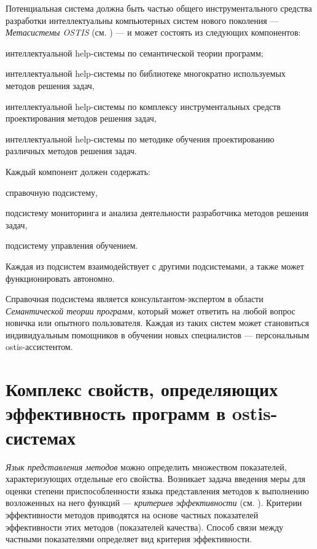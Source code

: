 Потенциальная система должна быть частью общего инструментального средства разработки интеллектуальны компьютерных систем нового поколения --- \textit{Метасистемы OSTIS} (см. ) --- и может состоять из следующих компонентов:
\begin{textitemize}
	\item интеллектуальной help-системы по семантической теории программ;
	\item интеллектуальной help-системы по библиотеке многократно используемых методов решения задач,
	\item интеллектуальной help-системы по комплексу инструментальных средств проектирования  методов решения задач,
	\item интеллектуальной help-системы по методике обучения проектированию различных методов решения задач.
\end{textitemize}

Каждый компонент должен содержать:
\begin{textitemize}
	\item справочную подсистему,
	\item подсистему мониторинга и анализа деятельности разработчика методов решения задач,
	\item подсистему управления обучением.
\end{textitemize}

Каждая из подсистем взаимодействует с другими подсистемами, а также может функционировать автономно.

Справочная подсистема является консультантом-экспертом в области \textit{Семантической теории программ}, который может ответить на любой вопрос новичка или опытного пользователя. Каждая из таких систем может становиться индивидуальным помощников в обучении новых специалистов --- персональным ostis-ассистентом.

\section{Комплекс свойств, определяющих эффективность программ в ostis-системах}
\label{sec_programs_method_kriteria}

\textit{Язык представления методов} можно определить множеством показателей, характеризующих отдельные его свойства. Возникает задача введения меры для оценки степени приспособленности языка представления методов к выполнению возложенных на него функций --- \textit{критериев эффективности} (см. ). Критерии эффективности методов приводятся на основе частных показателей эффективности этих методов (показателей качества). Способ связи между частными показателями определяет вид критерия эффективности.

